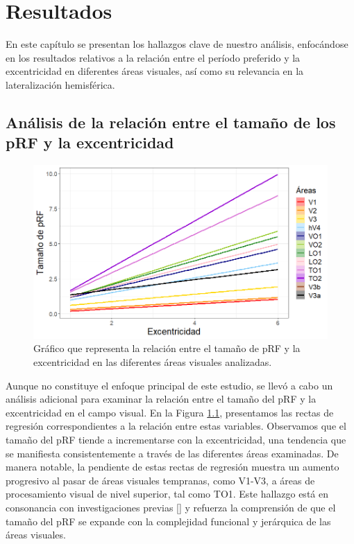 \chapter{Resultados}\label{chapter:results}

En este cap\'itulo se presentan los hallazgos clave de nuestro análisis, enfocándose en los resultados relativos a la relación entre el per\'iodo preferido y la excentricidad en diferentes áreas visuales, así como su relevancia en la lateralización hemisférica.

\section{Análisis de la relación entre el tamaño de los pRF y la excentricidad}

\begin{figure}[h]
	\centering
	\includegraphics[scale=0.6]{Graphics/size_vs_eccen_bayesian}
	\caption{Gráfico que representa la relación entre el tama\~no de pRF y la excentricidad en las diferentes áreas visuales analizadas.}
	\label{fig:sigma_vs_eccen}
\end{figure}

Aunque no constituye el enfoque principal de este estudio, se llevó a cabo un análisis adicional para examinar la relación entre el tamaño del pRF y la excentricidad en el campo visual. En la Figura \ref{fig:sigma_vs_eccen}, presentamos las rectas de regresión correspondientes a la relaci\'on entre estas variables. Observamos que el tamaño del pRF tiende a incrementarse con la excentricidad, una tendencia que se manifiesta consistentemente a través de las diferentes áreas examinadas. De manera notable, la pendiente de estas rectas de regresión muestra un aumento progresivo al pasar de áreas visuales tempranas, como V1-V3, a áreas de procesamiento visual de nivel superior, tal como TO1. Este hallazgo está en consonancia con investigaciones previas [\cite{wandell_computational_2015}] y refuerza la comprensión de que el tamaño del pRF se expande con la complejidad funcional y jerárquica de las áreas visuales.

